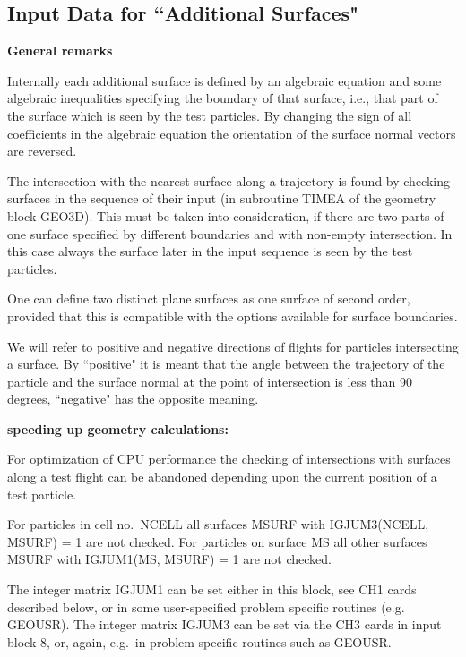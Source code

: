 \subsection{Input Data for ``Additional Surfaces"}
\label{sec2.3b}

\textbf{General remarks} 

\medskip 

Internally each additional surface is defined by an algebraic equation and some
algebraic inequalities specifying the boundary of that surface, i.e., that part
of the surface which is seen by the test particles.
By changing the sign of all coefficients in the algebraic equation the
orientation of the surface normal vectors are reversed.

The intersection with the nearest surface along a trajectory is found by
checking surfaces in the sequence of their input (in subroutine TIMEA of the
geometry block GEO3D).
This must be taken into consideration, if there are two parts of one surface
specified by different boundaries and with non-empty intersection.
In this case always the surface later in the input sequence is seen by the test
particles.

One can define two distinct plane surfaces as one surface of second order,
provided that this is compatible with the options available for surface
boundaries.

We will refer to positive and negative directions of flights for particles
intersecting a surface.
By ``positive" it is meant that the angle between the trajectory of the
particle and the surface normal at the point of intersection is less than 90
degrees, ``negative" has the opposite meaning.

\textbf{speeding up geometry calculations:} 

For optimization of CPU performance the checking of intersections with surfaces
along a test flight can be abandoned depending upon the current position of a
test particle.

For particles in cell no.\ NCELL all surfaces MSURF with IGJUM3(NCELL, MSURF) =
1 are not checked.
For particles on surface MS all other surfaces MSURF with IGJUM1(MS, MSURF) = 1
are not checked.

The integer matrix IGJUM1 can be set either in this block, see CH1 cards
described below, or in some user-specified problem specific routines (e.g.
GEOUSR).
The integer matrix IGJUM3 can be set via the CH3 cards in input block 8, or,
again, e.g.\ in problem specific routines such as GEOUSR.

